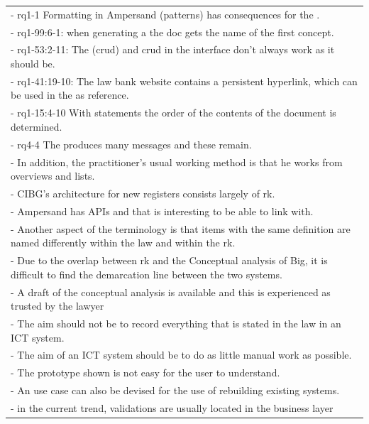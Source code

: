 \begin{xltabular}{\textwidth}{|X|}
-	rq1-1 Formatting in Ampersand ({pattern}s) has consequences for the .	\\
-	rq1-99:6-1: when generating a  the doc gets the name of the first concept.	\\
-	rq1-53:2-11: The  (\acrlong{crud}) and \acrshort{crud} in the {interface} don't always work as it should be.	\\
-	rq1-41:19-10: The law bank website contains a persistent hyperlink, which can be used in the  as reference.	\\
-	rq1-15:4-10 With  statements the order of the contents of the document is determined.	\\
-	rq4-4 The  produces many messages and these remain.	\\
-	In addition, the practitioner's usual working method is that he works from overviews and lists.	\\
-	CIBG's architecture for new registers consists largely of \acrlong{rk}.	\\
-	Ampersand has APIs and that is interesting to be able to link with.	\\
-	Another aspect of the terminology is that items with the same definition are named differently within the law and within the \acrlong{rk}.	\\
-	Due to the overlap between \acrlong{rk} and the Conceptual analysis of Big, it is difficult to find the demarcation line between the two systems.	\\
-	A draft of the conceptual analysis is available and this is experienced as trusted by the lawyer	\\
-	The aim should not be to record everything that is stated in the law in an ICT system.	\\
-	The aim of an ICT system should be to do as little manual work as possible. 	\\
-	The prototype shown is not easy for the user to understand. 	\\
-	An use case can also be devised for the use of rebuilding existing systems.	\\
-	in the current trend, validations are usually located in the business layer	\\
\end{xltabular}

